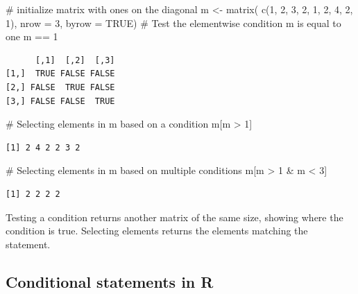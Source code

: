 \documentclass[
  letterpaper,
  DIV=11,
  numbers=noendperiod]{scrreprt}
\newenvironment{Shaded}{\begin{snugshade}}{\end{snugshade}}
\newcommand{\AttributeTok}[1]{\textcolor[rgb]{0.40,0.45,0.13}{#1}}
\newcommand{\CommentTok}[1]{\textcolor[rgb]{0.37,0.37,0.37}{#1}}
\newcommand{\ConstantTok}[1]{\textcolor[rgb]{0.56,0.35,0.01}{#1}}
\newcommand{\DecValTok}[1]{\textcolor[rgb]{0.68,0.00,0.00}{#1}}
\newcommand{\FunctionTok}[1]{\textcolor[rgb]{0.28,0.35,0.67}{#1}}
\newcommand{\NormalTok}[1]{\textcolor[rgb]{0.00,0.23,0.31}{#1}}
\newcommand{\OtherTok}[1]{\textcolor[rgb]{0.00,0.23,0.31}{#1}}
\newcommand{\SpecialCharTok}[1]{\textcolor[rgb]{0.37,0.37,0.37}{#1}}
\begin{document}
\begin{Shaded}
\begin{Highlighting}[]
\CommentTok{\# initialize matrix with ones on the diagonal}
\NormalTok{m }\OtherTok{\textless{}{-}} \FunctionTok{matrix}\NormalTok{(}
  \FunctionTok{c}\NormalTok{(}\DecValTok{1}\NormalTok{, }\DecValTok{2}\NormalTok{, }\DecValTok{3}\NormalTok{,}
    \DecValTok{2}\NormalTok{, }\DecValTok{1}\NormalTok{, }\DecValTok{2}\NormalTok{,}
    \DecValTok{4}\NormalTok{, }\DecValTok{2}\NormalTok{, }\DecValTok{1}\NormalTok{),}
  \AttributeTok{nrow =} \DecValTok{3}\NormalTok{,}
  \AttributeTok{byrow =} \ConstantTok{TRUE}\NormalTok{)}
\CommentTok{\# Test the elementwise condition m is equal to one}
\NormalTok{m }\SpecialCharTok{==} \DecValTok{1}
\end{Highlighting}
\end{Shaded}

\begin{verbatim}
      [,1]  [,2]  [,3]
[1,]  TRUE FALSE FALSE
[2,] FALSE  TRUE FALSE
[3,] FALSE FALSE  TRUE
\end{verbatim}

\begin{Shaded}
\begin{Highlighting}[]
\CommentTok{\# Selecting elements in m based on a condition}
\NormalTok{m[m }\SpecialCharTok{\textgreater{}} \DecValTok{1}\NormalTok{]}
\end{Highlighting}
\end{Shaded}

\begin{verbatim}
[1] 2 4 2 2 3 2
\end{verbatim}

\begin{Shaded}
\begin{Highlighting}[]
\CommentTok{\# Selecting elements in m based on multiple conditions}
\NormalTok{m[m }\SpecialCharTok{\textgreater{}} \DecValTok{1} \SpecialCharTok{\&}\NormalTok{ m }\SpecialCharTok{\textless{}} \DecValTok{3}\NormalTok{]}
\end{Highlighting}
\end{Shaded}

\begin{verbatim}
[1] 2 2 2 2
\end{verbatim}

Testing a condition returns another matrix of the same size, showing
where the condition is true. Selecting elements returns the elements
matching the statement.

\subsection{Conditional statements in
R}\label{conditional-statements-in-r}
\end{document}

